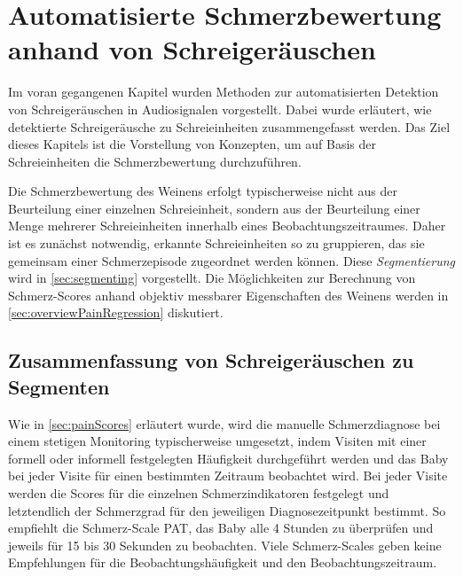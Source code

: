 \chapter{Automatisierte Schmerzbewertung anhand von Schreigeräuschen}
\label{sec:deduction}

Im voran gegangenen Kapitel wurden Methoden zur automatisierten Detektion von Schreigeräuschen in Audiosignalen vorgestellt. Dabei wurde erläutert, wie detektierte Schreigeräusche zu Schreieinheiten zusammengefasst werden. Das Ziel dieses Kapitels ist die Vorstellung von Konzepten, um auf Basis der Schreieinheiten die Schmerzbewertung durchzuführen. 

Die Schmerzbewertung des Weinens erfolgt typischerweise nicht aus der Beurteilung einer einzelnen Schreieinheit, sondern aus der Beurteilung einer Menge mehrerer Schreieinheiten innerhalb eines Beobachtungszeitraumes. Daher ist es zunächst notwendig, erkannte Schreieinheiten so zu gruppieren, das sie gemeinsam einer Schmerzepisode zugeordnet werden können. Diese \emph{Segmentierung} wird in \autoref{sec:segmenting} vorgestellt. Die Möglichkeiten zur Berechnung von Schmerz-Scores anhand objektiv messbarer Eigenschaften des Weinens werden in \autoref{sec:overviewPainRegression} diskutiert.

\section{Zusammenfassung von Schreigeräuschen zu Segmenten}
\label{sec:segmenting}

Wie in \autoref{sec:painScores} erläutert wurde, wird die manuelle Schmerzdiagnose bei einem stetigen Monitoring typischerweise umgesetzt, indem Visiten mit einer formell oder informell festgelegten Häufigkeit durchgeführt werden und das Baby bei jeder Visite für einen bestimmten Zeitraum beobachtet wird. Bei jeder Visite werden die Scores für die einzelnen Schmerzindikatoren festgelegt und letztendlich der Schmerzgrad für den jeweiligen Diagnosezeitpunkt bestimmt. So empfiehlt die Schmerz-Scale PAT, das Baby alle 4 Stunden zu überprüfen und jeweils für 15 bis 30 Sekunden zu beobachten. Viele Schmerz-Scales geben keine Empfehlungen für die Beobachtungshäufigkeit und den Beobachtungszeitraum. 

